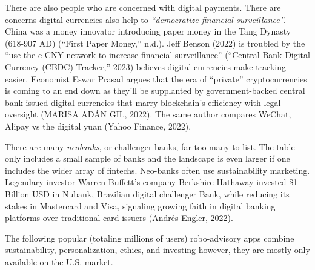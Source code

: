 \documentclass[
  12pt,
  letterpaper,
  DIV=11,
  numbers=noendperiod]{scrartcl}
\begin{document}
There are also people who are concerned with digital payments. There are
concerns digital currencies also help to \emph{``democratize financial
surveillance''.} China was a money innovator introducing paper money in
the Tang Dynasty (618-907 AD) ({``First Paper Money,''} n.d.). Jeff
Benson (2022) is troubled by the ``use the e-CNY network to increase
financial surveillance'' ({``Central {Bank Digital Currency} ({CBDC})
{Tracker},''} 2023) believes digital currencies make tracking easier.
Economist Eswar Prasad argues that the era of ``private''
cryptocurrencies is coming to an end down as they'll be supplanted by
government-backed central bank-issued digital currencies that marry
blockchain's efficiency with legal oversight (MARISA ADÁN GIL, 2022).
The same author compares WeChat, Alipay vs the digital yuan (Yahoo
Finance, 2022).

There are many \emph{neobanks}, or challenger banks, far too many to
list. The table only includes a small sample of banks and the landscape
is even larger if one includes the wider array of fintechs. Neo-banks
often use sustainability marketing. Legendary investor Warren Buffett's
company Berkshire Hathaway invested \$1 Billion USD in Nubank, Brazilian
digital challenger Bank, while reducing its stakes in Mastercard and
Visa, signaling growing faith in digital banking platforms over
traditional card-issuers (Andrés Engler, 2022).

The following popular (totaling millions of users) robo-advisory apps
combine sustainability, personalization, ethics, and investing however,
they are mostly only available on the U.S. market.

\def\pandoctableshortcapt{Comparing Investing Apps}
\end{document}
